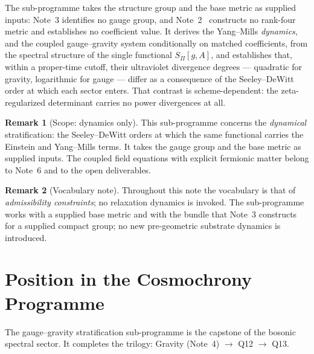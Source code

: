 \documentclass[11pt,a4paper]{article}
\theoremstyle{definition}
\newtheorem{remark}{Remark}
\newcommand{\SPI}{S_\Pi}
\begin{document}
    \medskip
    The sub-programme takes the structure group and the base metric as supplied inputs: Note~3 identifies no gauge
    group, and Note~2~\cite{Beau2026egnote} constructs no rank-four metric and establishes no coefficient value.
    It derives the Yang--Mills \emph{dynamics}, and the coupled gauge--gravity system conditionally on matched
    coefficients, from the spectral structure of the single functional $\SPI[g,A]$, and establishes that, within a
    proper-time
    cutoff, their ultraviolet divergence degrees --- quadratic for gravity, logarithmic for
    gauge --- differ as a consequence of the Seeley--DeWitt order at which each sector enters.
    That contrast is scheme-dependent: the zeta-regularized determinant carries no power
    divergences at all.

    \begin{remark}[Scope: dynamics only]
This sub-programme concerns the \emph{dynamical} stratification: the Seeley--DeWitt orders at which the same
functional carries the Einstein and Yang--Mills terms.
It takes the gauge group and the base metric as supplied inputs.
The coupled field equations with explicit fermionic matter belong to Note~6 and to the
open deliverables.
    \end{remark}

    \begin{remark}[Vocabulary note]
Throughout this note the vocabulary is that of \emph{admissibility constraints}; no relaxation
dynamics is invoked.
The sub-programme works with a supplied base metric and with the bundle that Note~3 constructs for a supplied
compact group; no new pre-geometric substrate dynamics is introduced.
    \end{remark}

  \section{Position in the Cosmochrony Programme}
    \label{sec:position}

    The gauge--gravity stratification sub-programme is the capstone of the bosonic spectral
    sector.
    It completes the trilogy: Gravity (Note~4) $\to$ Q12 $\to$ Q13.
\end{document}
